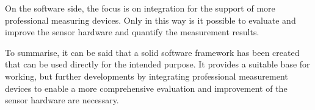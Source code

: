 On the software side, the focus is on integration for the support of
more professional measuring devices. Only in this way is it possible to
evaluate and improve the sensor hardware and quantify the measurement
results.

To summarise, it can be said that a solid software framework has been
created that can be used directly for the intended purpose. It provides
a suitable base for working, but further developments by integrating
professional measurement devices to enable a more comprehensive
evaluation and improvement of the sensor hardware are necessary.

